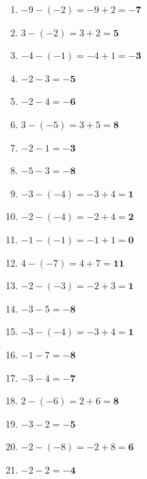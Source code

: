 \documentclass[a4paper,12pt]{article} %
\begin{document}
\begin{enumerate}
  \item \(-9 - (-2) = -9 + 2 = \mathbf{-7}\) %

  \item \(3 - (-2) = 3 + 2 = \mathbf{5}\) %

  \item \(-4 - (-1) = -4 + 1 = \mathbf{-3}\) %

  \item \(-2 - 3 = \mathbf{-5}\) %

  \item \(-2 - 4 = \mathbf{-6}\) %

  \item \(3 - (-5) = 3 + 5 = \mathbf{8}\) %

  \item \(-2 - 1 = \mathbf{-3}\) %

  \item \(-5 - 3 = \mathbf{-8}\) %

  \item \(-3 - (-4) = -3 + 4 = \mathbf{1}\) %

  \item \(-2 - (-4) = -2 + 4 = \mathbf{2}\) %

  \item \(-1 - (-1) = -1 + 1 = \mathbf{0}\) %

  \item \(4 - (-7) = 4 + 7 = \mathbf{11}\) %

  \item \(-2 - (-3) = -2 + 3 = \mathbf{1}\) %

  \item \(-3 - 5 = \mathbf{-8}\) %

  \item \(-3 - (-4) = -3 + 4 = \mathbf{1}\) %

  \item \(-1 - 7 = \mathbf{-8}\) %

  \item \(-3 - 4 = \mathbf{-7}\) %

  \item \(2 - (-6) = 2 + 6 = \mathbf{8}\) %

  \item \(-3 - 2 = \mathbf{-5}\) %

  \item \(-2 - (-8) = -2 + 8 = \mathbf{6}\) %

  \item \(-2 - 2 = \mathbf{-4}\) %


\end{enumerate}
\end{document}
